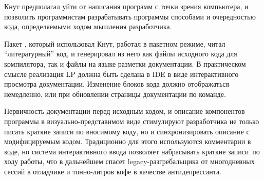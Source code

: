 Кнут предполагал уйти от написания программ с точки зрения компьютера, и
позволить программистам разрабатывать программы способами и очередностью кода,
определяемыми ходом мышления разработчика.

Пакет , который использовал Кнут, работал в пакетном режиме, читал
``литературный'' код, и генерировал из него как файлы исходного кода для
компилятора, так и файлы на языке разметки документации\note{\TeX}.
В практическом смысле реализация LP должна быть сделана в IDE в виде
интерактивного просмотра документации. Изменение блоков кода должно отображаться
немедленно, или при обновлении страницы документации по команде.

Первичность документации перед исходным кодом, и описание компонентов программы
в визуально-представимом виде стимулируют разработчика не только писать краткие
записи по вносимому коду, но и синхронизировать описание с модифицируемым кодом.
Традиционно для этого используются комментарии в коде, но система интерактивного
ввода позволяет набрасывать краткие записи\ по ходу
работы, что в дальнейшем спасет legacy-разгребальщика от многодневных сессий в
отладчике и тонно-литров кофе в качестве антидепрессанта.


